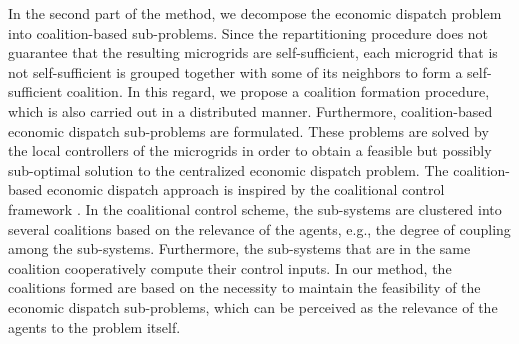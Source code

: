 In the second part of the method, we decompose the economic dispatch problem into coalition-based sub-problems. Since the repartitioning procedure does not guarantee that the resulting microgrids are self-sufficient, each microgrid that is not self-sufficient is grouped together with some of its neighbors to form a self-sufficient coalition. %
In this regard, we propose a coalition formation procedure, which is also carried out in a distributed manner. Furthermore, coalition-based economic dispatch sub-problems are formulated. These problems are solved by the local controllers of the microgrids in order to obtain a feasible but possibly sub-optimal solution to the centralized economic dispatch problem. 
The coalition-based economic dispatch approach is inspired by the coalitional control framework \cite{fele2017,muros2017,fele2018}. In the coalitional control scheme, the sub-systems are clustered into several coalitions based on the relevance of the agents, e.g., the degree of coupling among the sub-systems. Furthermore, the sub-systems that are in the same coalition cooperatively compute their control inputs. 
 In our method, the coalitions formed are based on the necessity to maintain the feasibility of the economic dispatch sub-problems, which can be perceived as the relevance of the agents to the problem itself. \color{black} %


